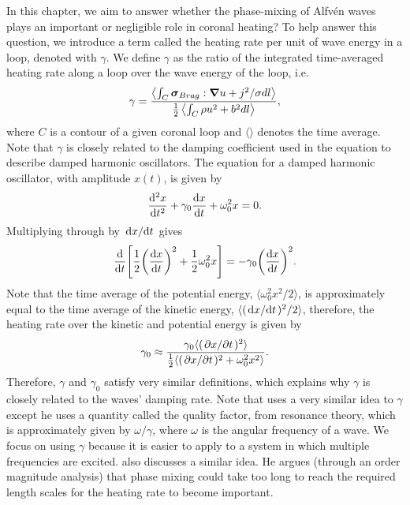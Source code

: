 In this chapter, we aim to answer whether the phase-mixing of Alfv\'en waves plays an important or negligible role in coronal heating? To help answer this question, we introduce a term called the heating rate per unit of wave energy in a loop, denoted with $\gamma$. We define $\gamma$ as the ratio of the integrated time-averaged heating rate along a loop over the wave energy of the loop, i.e.
\begin{equation}
    \gamma = \frac{\left\langle\int_C \boldsymbol{\sigma}_{Brag}:\grad{u} + j^2/\sigma dl\right\rangle}{\frac{1}{2}\left\langle\int_C \rho u^2 + b^2 dl\right\rangle},
\end{equation}
where $C$ is a contour of a given coronal loop and $\langle\rangle$ denotes the time average. Note that $\gamma$ is closely related to the damping coefficient used in the equation to describe damped harmonic oscillators. The equation for a damped harmonic oscillator, with amplitude $x(t)$, is given by
\begin{equation}
    \dv[2]{x}{t}+\gamma_0\dv{x}{t}+\omega_0^2 x = 0.
\end{equation}
Multiplying through by $\dv*{x}{t}$ gives
\begin{equation}
    \dv{}{t}\qty[\frac{1}{2}\qty(\dv{x}{t})^2+\frac{1}{2}\omega_0^2 x] = -\gamma_0 \qty(\dv{x}{t})^2.
\end{equation}
Note that the time average of the potential energy, $\langle \omega_0^2 x^2 / 2 \rangle$, is approximately equal to the time average of the kinetic energy, $\langle (\dv*{x}{t})^2/2\rangle$, therefore, the heating rate over the kinetic and potential energy is given by
\begin{equation}
    \gamma_0 \approx \frac{\gamma_0\langle (\pdv*{x}{t})^2\rangle}{\frac{1}{2}\langle(\pdv*{x}{t})^2+\omega_0^2x^2\rangle}.
\end{equation}
Therefore, $\gamma$ and $\gamma_0$ satisfy very similar definitions, which explains why $\gamma$ is closely related to the waves' damping rate. Note that \citet{Hollweg1984a,Hollweg1984b} uses a very similar idea to $\gamma$ except he uses a quantity called the quality factor, from resonance theory, which is approximately given by $\omega / \gamma$, where $\omega$ is the angular frequency of a wave. We focus on using $\gamma$ because it is easier to apply to a system in which multiple frequencies are excited. \citet{Arregui2015} also discusses a similar idea. He argues (through an order magnitude analysis) that phase mixing could take too long to reach the required length scales for the heating rate to become important.

